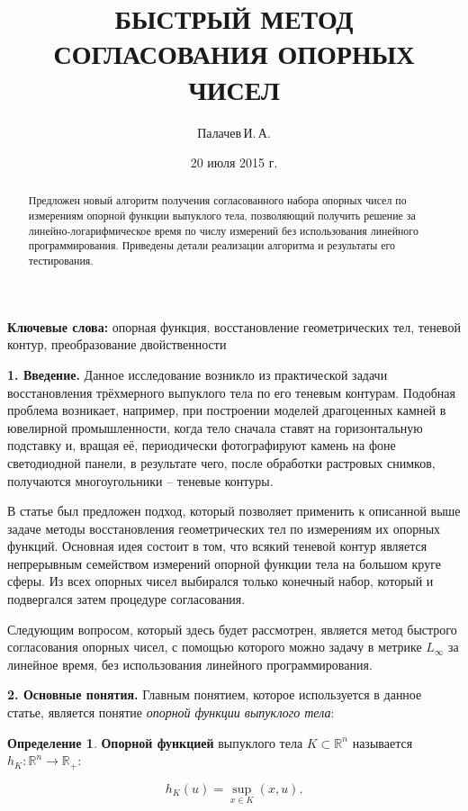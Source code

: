 \documentclass[a4paper, 10pt]{article}
\title{БЫСТРЫЙ МЕТОД СОГЛАСОВАНИЯ ОПОРНЫХ ЧИСЕЛ}
\author{Палачев\,И.\,А.}
\date{20 июля 2015 г.}
\theoremstyle{definition}
\newtheorem{SmartDefinition}{Определение}
\theoremstyle{plain}
\theoremstyle{plain}
\begin{document}
\maketitle

\begin{abstract}
Предложен новый алгоритм получения согласованного набора опорных чисел по
измерениям опорной функции выпуклого тела, позволяющий получить решение за
линейно-логарифмическое время по числу измерений без использования линейного
программирования. Приведены детали реализации алгоритма и результаты его
тестирования.
\end{abstract}

\textbf{Ключевые слова:} опорная функция, восстановление геометрических тел,
теневой контур, преобразование двойственности

\textbf{1. Введение.}
Данное исследование возникло из практической задачи восстановления трёхмерного
выпуклого тела по его теневым контурам. Подобная проблема возникает, например,
при построении моделей драгоценных камней в ювелирной промышленности, когда
тело сначала ставят на горизонтальную подставку и, вращая её, периодически
фотографируют камень на фоне светодиодной панели, в результате чего, после
обработки растровых снимков, получаются многоугольники -- теневые контуры.

В статье \cite{palachev} был предложен подход, который позволяет применить к
описанной выше задаче методы восстановления геометрических тел по измерениям их
опорных функций. Основная идея состоит в том, что всякий теневой контур является
непрерывным семейством измерений опорной функции тела на большом круге сферы.
Из всех опорных чисел выбирался только конечный набор, который и подвергался
затем процедуре согласования.

Следующим вопросом, который здесь будет рассмотрен, является метод быстрого
согласования опорных чисел, с помощью которого можно задачу в метрике
$L_{\infty}$ за линейное время, без использования линейного программирования.

\textbf{2. Основные понятия.}
Главным понятием, которое используется в данное статье, является понятие
\textit{опорной функции выпуклого тела}:

\begin{SmartDefinition}
 \label{def:support-function}
 \textbf{Опорной функцией} выпуклого тела $K \subset \mathbb{R}^{n}$
 называется
 $h_{K}: \mathbb{R}^{n} \to \mathbb{R}_{+}$:

 \begin{equation*}h_{K}(u) = \sup \limits_{x \in K}(x, u).\end{equation*}
\end{SmartDefinition}
\end{document}

